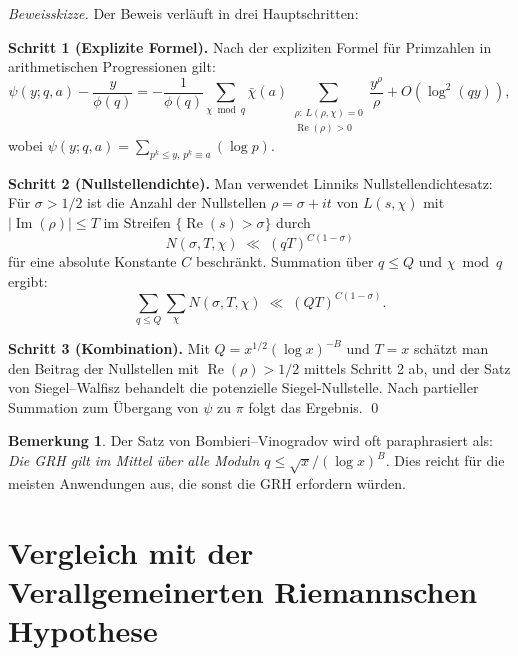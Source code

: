 \documentclass[12pt,a4paper]{amsart}
\theoremstyle{definition}
\newtheorem{bemerkung}[theorem]{Bemerkung}
\begin{document}
\textit{Beweisskizze.}
Der Beweis verläuft in drei Hauptschritten:

\textbf{Schritt 1 (Explizite Formel).}  Nach der expliziten Formel für
Primzahlen in arithmetischen Progressionen gilt:
\[
  \psi(y;q,a) - \frac{y}{\phi(q)}
  = -\frac{1}{\phi(q)}\sum_{\chi\bmod q}\bar\chi(a)
    \sum_{\substack{\rho:\, L(\rho,\chi)=0\\\operatorname{Re}(\rho)>0}}
    \frac{y^{\rho}}{\rho}
  + O(\log^2(qy)),
\]
wobei $\psi(y;q,a) = \sum_{p^k \leq y,\, p^k \equiv a}(\log p)$.

\textbf{Schritt 2 (Nullstellendichte).}
Man verwendet Linniks Nullstellendichtesatz: Für $\sigma > 1/2$ ist die
Anzahl der Nullstellen $\rho = \sigma + it$ von $L(s,\chi)$ mit
$|\operatorname{Im}(\rho)| \leq T$ im Streifen $\{\operatorname{Re}(s) > \sigma\}$ durch
\[
  N(\sigma, T, \chi) \;\ll\; (qT)^{C(1-\sigma)}
\]
für eine absolute Konstante $C$ beschränkt.  Summation über $q \leq Q$
und $\chi\bmod q$ ergibt:
\[
  \sum_{q \leq Q}\sum_\chi N(\sigma,T,\chi)
  \;\ll\; (QT)^{C(1-\sigma)}.
\]

\textbf{Schritt 3 (Kombination).}
Mit $Q = x^{1/2}(\log x)^{-B}$ und $T = x$ schätzt man den Beitrag der
Nullstellen mit $\operatorname{Re}(\rho) > 1/2$ mittels Schritt 2 ab, und der Satz von
Siegel--Walfisz behandelt die potenzielle Siegel-Nullstelle.  Nach partieller
Summation zum Übergang von $\psi$ zu $\pi$ folgt das Ergebnis.  \qed

\begin{bemerkung}
  Der Satz von Bombieri--Vinogradov wird oft paraphrasiert als:
  \emph{Die GRH gilt im Mittel über alle Moduln $q \leq \sqrt{x}/(\log x)^B$.}
  Dies reicht für die meisten Anwendungen aus, die sonst die GRH erfordern
  würden.
\end{bemerkung}

\section{Vergleich mit der Verallgemeinerten Riemannschen Hypothese}
\end{document}
